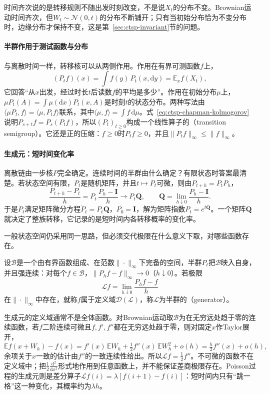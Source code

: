 时间齐次说的是转移规则不随出发时刻改变，不是说$X_t$的分布不变。Brownian运动时间齐次，但$W_t\sim\mathcal N(0,t)$的分布不断铺开；只有当初始分布恰为不变分布时，边缘分布才保持不变，这是第~\ref{sec:ctsp-invariant}节的问题。

\paragraph{半群作用于测试函数与分布}
与离散时间一样，转移核可以从两侧作用。作用在有界可测函数$f$上，
\[
  (P_tf)(x)=\int f(y)\,P_t(x,\mathrm dy)=\mathbb E_x f(X_t),
\]
它回答“从$x$出发，经过时长$t$后读数$f$的平均是多少”。作用在初始分布$\mu$上，$\mu P_t(A)=\int\mu(\mathrm dx)P_t(x,A)$是时刻$t$的状态分布。两种写法由$\langle\mu P_t,f\rangle=\langle\mu,P_tf\rangle$联系，其中$\langle\mu,f\rangle=\int f\,\mathrm d\mu$。式~\eqref{eq:ctsp-chapman-kolmogorov}说明$P_{s+t}f=P_s(P_tf)$，所以$(P_t)_{t\geq0}$构成一个线性算子的（transition semigroup）。它还是正的压缩：$f\geq0$时$P_tf\geq0$，并且$\|P_tf\|_\infty\leq\|f\|_\infty$。

\paragraph{生成元：短时间变化率}
离散链由一步核$P$完全确定。连续时间的半群由什么确定？有限状态时答案最清楚。若状态空间有限，$P_t$是随机矩阵，并且$t\mapsto P_t$可微，则由$P_{t+h}=P_tP_h$，
\[
  \frac{P_{t+h}-P_t}h=P_t\,\frac{P_h-\bm I}h\longrightarrow P_t\bm Q,\qquad
  \bm Q=\lim_{h\downarrow0}\frac{P_h-\bm I}h .
\]
于是$P_t$满足矩阵微分方程$\dot P_t=P_t\bm Q$，$P_0=\bm I$，解为矩阵指数$P_t=e^{t\bm Q}$。一个矩阵$\bm Q$就决定了整族转移，它记录的是短时间内各转移概率的变化率。

一般状态空间仍采用同一思路，但必须交代极限在什么意义下取，对哪些函数存在。

\begin{definition}[半群的生成元]
  \label{def:ctsp-generator}
  设$\mathcal B$是一个由有界函数组成、在范数$\|\cdot\|_\infty$下完备的空间，半群$P_t$把$\mathcal B$映入自身，并且强连续：对每个$f\in\mathcal B$，$\|P_hf-f\|_\infty\to0$（$h\downarrow0$）。若极限
  \[
    \mathcal Lf=\lim_{h\downarrow0}\frac{P_hf-f}h
  \]
  在$\|\cdot\|_\infty$中存在，就称$f$属于定义域$\mathcal D(\mathcal L)$，称$\mathcal L$为半群的（generator）。
\end{definition}

生成元的定义域通常不是全体函数。对Brownian运动取$\mathcal B$为在无穷远处趋于零的连续函数，若$f$二阶连续可微且$f,f',f''$都在无穷远处趋于零，则对固定$x$作Taylor展开，
\[
  \mathbb Ef(x+W_h)-f(x)=f'(x)\,\mathbb EW_h+\tfrac12f''(x)\,\mathbb EW_h^2+o(h)=\tfrac h2f''(x)+o(h),
\]
余项关于$x$一致的估计由$f''$的一致连续性给出。所以$\mathcal Lf=\frac12f''$。不可微的函数不在定义域中；把$\frac12\frac{\mathrm d^2}{\mathrm dx^2}$形式地作用到任意函数上，并不能保证差商极限存在。Poisson过程的生成元则是差分算子$\mathcal Lf(i)=\lambda[f(i+1)-f(i)]$：短时间内只有“跳一格”这一种变化，其概率约为$\lambda h$。

